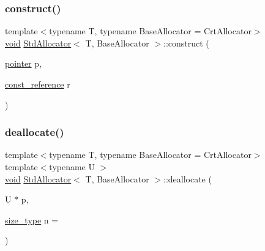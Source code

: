 \subsubsection{\texorpdfstring{construct()}{construct()}}
{\footnotesize\ttfamily template$<$typename T, typename Base\+Allocator = Crt\+Allocator$>$ \\
\hyperlink{imgui__impl__opengl3__loader_8h_ac668e7cffd9e2e9cfee428b9b2f34fa7}{void} \hyperlink{classStdAllocator}{Std\+Allocator}$<$ T, Base\+Allocator $>$\+::construct (\begin{DoxyParamCaption}\item[{\hyperlink{classStdAllocator_a0c970fb2525af736640f0ac3a29d45c5}{pointer}}]{p,  }\item[{\hyperlink{classStdAllocator_a2bc4a28386765e3a2c105b270793a49e}{const\+\_\+reference}}]{r }\end{DoxyParamCaption})\hspace{0.3cm}{\ttfamily [inline]}}

\mbox{\label{classStdAllocator_a92371ba62f651185c0d3eef856080cfa}} 
\subsubsection{\texorpdfstring{deallocate()}{deallocate()}\hspace{0.1cm}{\footnotesize\ttfamily [1/2]}}
{\footnotesize\ttfamily template$<$typename T, typename Base\+Allocator = Crt\+Allocator$>$ \\
template$<$typename U $>$ \\
\hyperlink{imgui__impl__opengl3__loader_8h_ac668e7cffd9e2e9cfee428b9b2f34fa7}{void} \hyperlink{classStdAllocator}{Std\+Allocator}$<$ T, Base\+Allocator $>$\+::deallocate (\begin{DoxyParamCaption}\item[{U $\ast$}]{p,  }\item[{\hyperlink{classStdAllocator_af0b177dc293fe5b985ba9e27de23b2c1}{size\+\_\+type}}]{n = {} }\end{DoxyParamCaption})\hspace{0.3cm}{\ttfamily [inline]}}

\mbox{\label{classStdAllocator_a96a27b5bc9919d08013e727f5217db7a}} 
